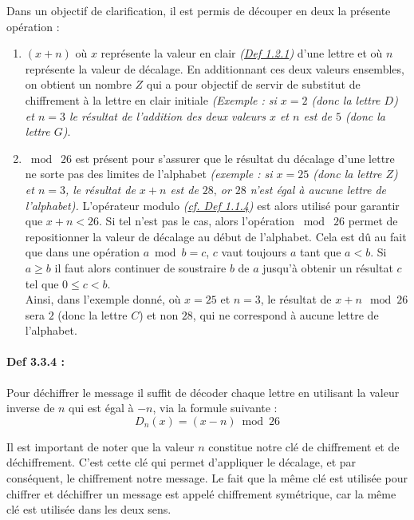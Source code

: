 \documentclass{article}
\begin{document}
Dans un objectif de clarification, il est permis de découper en deux
la présente opération :

\begin{enumerate}
	\def\labelenumi{\arabic{enumi}.}
	\item
	\((x+n)\) où \(x\) représente la valeur en clair
	\textit{(\hyperref[def-1.2.1]{Def 1.2.1})} d'une lettre et où \(n\) représente
	la valeur de décalage. En additionnant ces deux valeurs ensembles, on
	obtient un nombre \(Z\) qui a pour objectif de servir de substitut de chiffrement
	à la lettre en clair initiale \textit{(Exemple : si \(x = 2\) (donc la
		lettre \(D\)) et \(n=3\) le résultat de l'addition des deux valeurs
		\(x\) et \(n\) est de \(5\) (donc la lettre \(G\))}.
	\item
	\(\bmod \;26\) est présent pour s'assurer que le résultat du décalage d'une lettre ne sorte pas des limites de l'alphabet \textit{(exemple : si \(x=25\) (donc la lettre \(Z\)) et \(n=3\), le résultat de \(x+n\) est de \(28\text{,}\) or \(28\) n'est égal à aucune lettre de l'alphabet).} L'opérateur modulo \textit{(\hyperref[def-1.1.4]{cf. Def 1.1.4})} est alors utilisé pour garantir que \(x+n < 26\). Si tel n'est pas le cas, alors l'opération \(\bmod \; 26\) permet de repositionner la valeur de décalage au début de l'alphabet.  Cela est dû au fait que dans une opération \(a \bmod b = c\),  $c$ vaut toujours \(a\) tant que \(a < b\). Si \(a \geq b\)  il faut alors continuer de soustraire $b$ de $a$ jusqu'à obtenir un résultat $c$ tel que $0 \leq c < b$. \\
	
	Ainsi, dans l'exemple donné, où
	\(x=25\) et \(n=3\), le résultat de \(x+n \mod 26\) sera \(2\)
	(donc la lettre \(C\)) et non \(28\), qui ne correspond à aucune
	lettre de l'alphabet.
\end{enumerate}

\paragraph{Def 3.3.4 :}\label{def-3.3.4}

Pour déchiffrer le message il suffit de décoder chaque lettre en
utilisant la valeur inverse de \(n\) qui est égal à \(-n\), via la
formule suivante : \[
D_n(x)=(x-n) \bmod 26
\]

Il est important de noter que la valeur \(n\) constitue notre clé de
chiffrement et de déchiffrement. C'est cette clé qui permet d'appliquer
le décalage, et par conséquent, le chiffrement notre message. Le fait
que la même clé est utilisée pour chiffrer et déchiffrer un message est
appelé chiffrement symétrique, car la même clé est utilisée dans les
deux sens. \\
\end{document}
